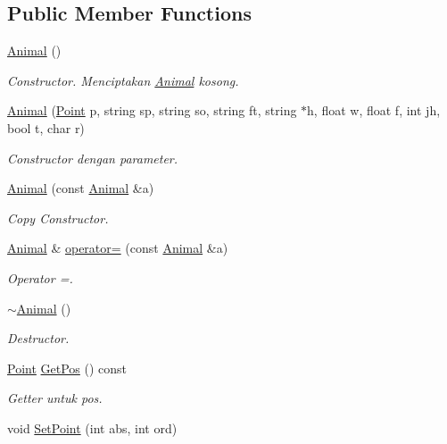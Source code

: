 \subsection*{Public Member Functions}
\begin{DoxyCompactItemize}
\item 
\hyperlink{classAnimal_a1e726a49ec952443190ac62dad22353c}{Animal} ()
\begin{DoxyCompactList}\small\item\em Constructor. Menciptakan \hyperlink{classAnimal}{Animal} kosong. \end{DoxyCompactList}\item 
\hyperlink{classAnimal_a7aeb08a1d5399b8719949bc32e41be24}{Animal} (\hyperlink{classPoint}{Point} p, string sp, string so, string ft, string $\ast$h, float w, float f, int jh, bool t, char r)
\begin{DoxyCompactList}\small\item\em Constructor dengan parameter. \end{DoxyCompactList}\item 
\hyperlink{classAnimal_a90c725c5298037a1aa5448d4356b04db}{Animal} (const \hyperlink{classAnimal}{Animal} \&a)
\begin{DoxyCompactList}\small\item\em Copy Constructor. \end{DoxyCompactList}\item 
\hyperlink{classAnimal}{Animal} \& \hyperlink{classAnimal_ab9ea212f94920608ab2dd072fcaf26c1}{operator=} (const \hyperlink{classAnimal}{Animal} \&a)
\begin{DoxyCompactList}\small\item\em Operator =. \end{DoxyCompactList}\item 
\hyperlink{classAnimal_a476af25adde5f0dfa688129c8f86fa5c}{$\sim$\+Animal} ()
\begin{DoxyCompactList}\small\item\em Destructor. \end{DoxyCompactList}\item 
\hyperlink{classPoint}{Point} \hyperlink{classAnimal_a183e4addbbccbe06a77e57bc8893cec1}{Get\+Pos} () const 
\begin{DoxyCompactList}\small\item\em Getter untuk pos. \end{DoxyCompactList}\item 
void \hyperlink{classAnimal_a754c7eb7a8ca6d8bd3e30650546a410d}{Set\+Point} (int abs, int ord)

\end{DoxyCompactItemize}
